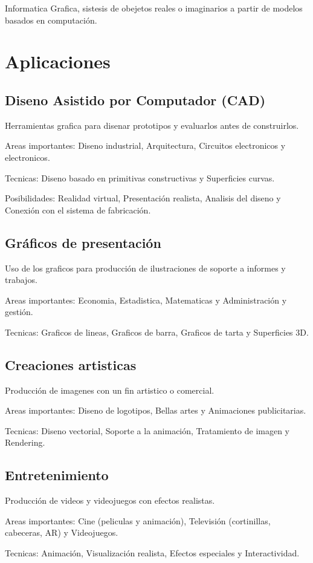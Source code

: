 \documentclass[12pt, twoside, openright]{report} %
\begin{document}
Informatica Grafica, sistesis de obejetos reales o imaginarios a partir de modelos basados en computación.

\section{Aplicaciones}
\subsection{Diseno Asistido por Computador (CAD)}
Herramientas grafica para disenar prototipos y evaluarlos antes de construirlos.

Areas importantes: Diseno industrial, Arquitectura, Circuitos electronicos y electronicos.

Tecnicas: Diseno basado en primitivas constructivas y Superficies curvas.

Posibilidades: Realidad virtual, Presentación realista, Analisis del diseno y Conexión con el sistema de fabricación.
\subsection{Gráficos de presentación}
Uso de los graficos para producción de ilustraciones de soporte a informes y trabajos.

Areas importantes: Economia, Estadistica, Matematicas y Administración y gestión.

Tecnicas: Graficos de lineas, Graficos de barra, Graficos de tarta y Superficies 3D.
\subsection{Creaciones artisticas}
Producción de imagenes con un fin artistico o comercial.

Areas importantes: Diseno de logotipos, Bellas artes y Animaciones publicitarias.

Tecnicas: Diseno vectorial, Soporte a la animación, Tratamiento de imagen y Rendering.

\subsection{Entretenimiento}
Producción de videos y videojuegos con efectos realistas.

Areas importantes: Cine (peliculas y animación), Televisión (cortinillas, cabeceras, AR) y Videojuegos.

Tecnicas: Animación, Visualización realista, Efectos especiales y Interactividad.
\end{document}
